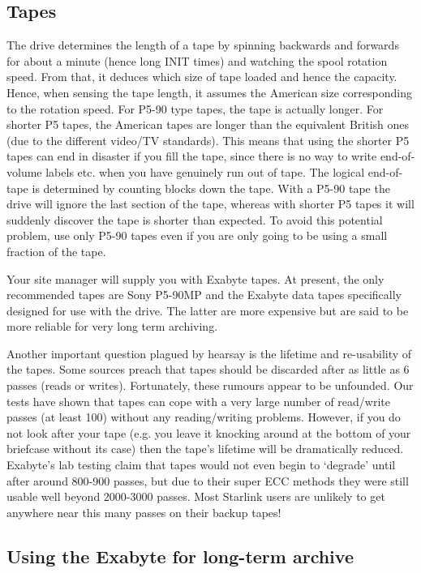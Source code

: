 \subsection {Tapes}

The drive determines the length of a tape by  spinning backwards and forwards
for about a minute (hence long INIT times) and watching the spool
rotation speed. From that, it
deduces which size of tape loaded and hence the capacity.
Hence, when sensing the tape length, it assumes
the American size corresponding to the rotation speed. For P5-90 type tapes, 
the tape is
actually longer. For shorter P5 tapes, the American tapes are
longer than the equivalent British ones (due to the different video/TV
standards). This means that using the shorter P5 tapes can end in disaster  if
you fill the tape, since there is no way to write end-of-volume labels etc.
when you have genuinely run out of tape. The logical end-of-tape is determined by
counting blocks down the tape. With a P5-90 tape the drive will ignore the last section
of the tape, whereas with shorter P5 tapes it will suddenly
discover the tape is shorter than expected. 
To avoid this potential problem, use only P5-90 tapes even if you are only
going to be using a small fraction of the tape.

Your site manager will supply you with Exabyte tapes. 
At present, the only recommended tapes are Sony P5-90MP and the Exabyte
data tapes specifically designed for use with the drive. The latter
are more expensive but are said to be more reliable for very long term 
archiving.

Another important question plagued by hearsay is the lifetime and re-usability
of the tapes. Some sources preach  that tapes should be discarded 
after as little as 6 passes (reads or writes).
Fortunately, these rumours appear to be unfounded. Our tests have
shown
that tapes can cope with a very large number of read/write
passes  (at least 100) without any reading/writing problems. However,
if you do not look after your tape (e.g. you leave it knocking around at the
bottom of your briefcase without its case) then the tape's lifetime will be
dramatically reduced.
Exabyte's lab testing claim that tapes would not
even begin to `degrade' until after around 800-900 passes, but due to their
super ECC methods they were still usable well beyond 2000-3000 passes.
Most Starlink users are unlikely to get anywhere near this many passes on 
their backup tapes!

\subsection{Using the Exabyte for long-term archive}

